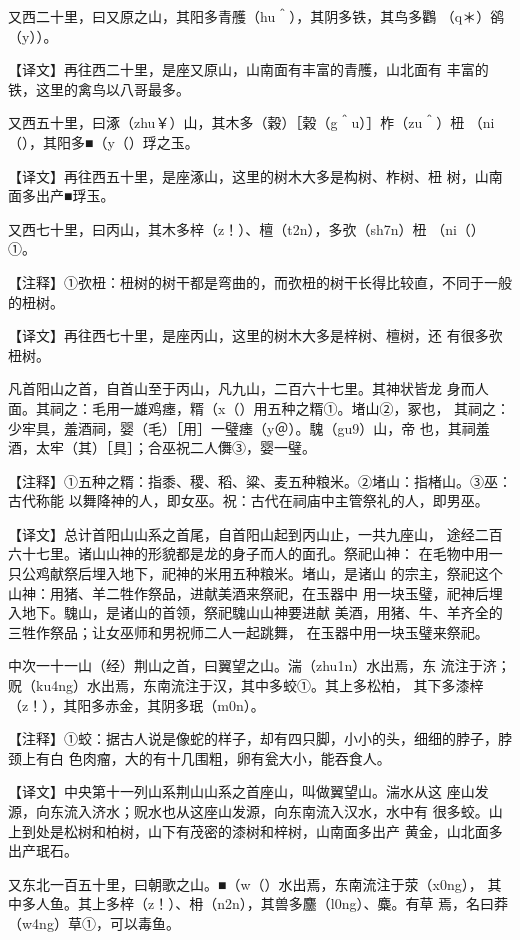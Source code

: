 \documentclass[a4paper,12pt,UTF8,twoside]{ctexbook}
\begin{document}
又西二十里，曰又原之山，其阳多青雘（hu＾），其阴多铁，其鸟多鸜 （q＊）鹆（y））。

【译文】再往西二十里，是座又原山，山南面有丰富的青雘，山北面有 丰富的铁，这里的禽鸟以八哥最多。

又西五十里，曰涿（zhu￥）山，其木多（穀）［榖（g＾u）］柞（zu＾）杻 （ni（），其阳多■（y（）琈之玉。

【译文】再往西五十里，是座涿山，这里的树木大多是构树、柞树、杻 树，山南面多出产■琈玉。

又西七十里，曰丙山，其木多梓（z！）、檀（t2n），多弞（sh7n）杻 （ni（）①。

【注释】①弞杻：杻树的树干都是弯曲的，而弞杻的树干长得比较直，不同于一般的杻树。

【译文】再往西七十里，是座丙山，这里的树木大多是梓树、檀树，还 有很多弞杻树。

凡首阳山之首，自首山至于丙山，凡九山，二百六十七里。其神状皆龙 身而人面。其祠之：毛用一雄鸡瘗，糈（x（）用五种之糈①。堵山②，冢也， 其祠之：少牢具，羞酒祠，婴（毛）［用］一璧瘗（y＠）。騩（gu9）山，帝 也，其祠羞酒，太牢（其）［具］；合巫祝二人儛③，婴一璧。

【注释】①五种之糈：指黍、稷、稻、粱、麦五种粮米。②堵山：指楮山。③巫：古代称能 以舞降神的人，即女巫。祝：古代在祠庙中主管祭礼的人，即男巫。

【译文】总计首阳山山系之首尾，自首阳山起到丙山止，一共九座山， 途经二百六十七里。诸山山神的形貌都是龙的身子而人的面孔。祭祀山神： 在毛物中用一只公鸡献祭后埋入地下，祀神的米用五种粮米。堵山，是诸山 的宗主，祭祀这个山神：用猪、羊二牲作祭品，进献美酒来祭祀，在玉器中 用一块玉璧，祀神后埋入地下。騩山，是诸山的首领，祭祀騩山山神要进献 美酒，用猪、牛、羊齐全的三牲作祭品；让女巫师和男祝师二人一起跳舞， 在玉器中用一块玉璧来祭祀。

中次一十一山（经）荆山之首，曰翼望之山。湍（zhu1n）水出焉，东 流注于济；贶（ku4ng）水出焉，东南流注于汉，其中多蛟①。其上多松柏， 其下多漆梓（z！），其阳多赤金，其阴多珉（m0n）。

【注释】①蛟：据古人说是像蛇的样子，却有四只脚，小小的头，细细的脖子，脖颈上有白 色肉瘤，大的有十几围粗，卵有瓮大小，能吞食人。

【译文】中央第十一列山系荆山山系之首座山，叫做翼望山。湍水从这 座山发源，向东流入济水；贶水也从这座山发源，向东南流入汉水，水中有 很多蛟。山上到处是松树和柏树，山下有茂密的漆树和梓树，山南面多出产 黄金，山北面多出产珉石。

又东北一百五十里，曰朝歌之山。■（w（）水出焉，东南流注于荥（x0ng）， 其中多人鱼。其上多梓（z！）、枏（n2n），其兽多麢（l0ng）、麋。有草 焉，名曰莽（w4ng）草①，可以毒鱼。
\end{document}
